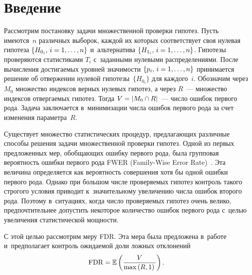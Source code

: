 
  



\thispagestyle{headings}

\begin{multicols}{2}

\label{st\stat}

\section{Введение}

Рассмотрим постановку задачи множественной проверки гипотез. Пусть имеются~$n$ 
различных выборок, каждой их которых соответствует своя нулевая гипотеза 
$\{H_{0_i},\, i \hm= 1,\ldots,n\}$ и~альтернатива $\{H_{1_i},\, i \hm= 1,\ldots,n\}$. 
Гипотезы проверяются статистиками $T_i$ с~заданными нулевыми распределениями. 
После вычисления достигаемых уровней значимости $\{p_i,\, i \hm= 1,\ldots, n\}$ 
принимается решение об отвержении нулевой гипотезы~$\{H_{0_i}\}$ для каждого~$i$. 
Обозначим через $M_0$ множество индексов верных нулевых гипотез, а через 
$R$~--- множество индексов отвергаемых гипотез. Тогда $V \hm= |M_0\hm \cap R|$~--- число 
ошибок первого рода. Задача заключается в~минимизации числа ошибок первого рода 
за счет изменения параметра~$R$.

Существует множество статистических процедур, предлагающих различные способы 
решения задачи множественной проверки гипотез. Одной из первых предложенных мер, 
обобщающих ошибку первого рода, была групповая вероятность ошибки первого рода 
FWER (Family-Wise Error Rate)~\cite{Storey}. Эта величина определяется как 
вероятность совершения хотя бы одной ошибки первого рода. Однако при большом 
числе проверяемых гипотез контроль такого строгого условия приводит 
к~значительному увеличению числа ошибок второго рода. Поэтому в~ситуациях, когда 
число проверяемых гипотез очень велико, предпочтительнее допустить некоторое 
количество ошибок первого рода с~целью увеличения статистической мощности.

С этой целью рассмотрим меру FDR. Эта мера была 
предложена в~работе~\cite{Benjamini-Hochberg} и~предполагает контроль ожи\-да\-емой 
доли ложных отклонений 
$$ \mathrm{FDR} =   \mathbb{E}\left(\displaystyle\frac{\displaystyle V\mathstrut}{\displaystyle \max\left(R,1\right)\mathstrut}\right).
$$


\end{multicols}
